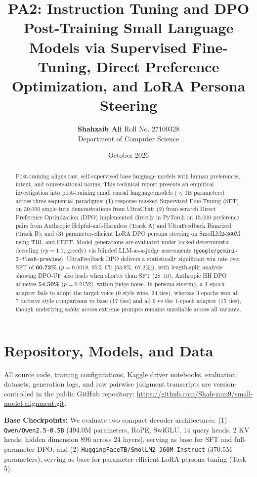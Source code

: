 \documentclass[11pt,a4paper]{article}
\title{\textbf{PA2: Instruction Tuning and DPO}\\
\large Post-Training Small Language Models via Supervised Fine-Tuning, Direct Preference Optimization, and LoRA Persona Steering}
\author{\textbf{Shahzaib Ali} \quad Roll No. 27100328\\
Department of Computer Science}
\date{October 2026}
\begin{document}
\maketitle

\begin{abstract}
Post-training aligns raw, self-supervised base language models with human preferences, intent, and conversational norms. This technical report presents an empirical investigation into post-training small causal language models ($<1\text{B}$ parameters) across three sequential paradigms: (1) response-masked Supervised Fine-Tuning (SFT) on 30,000 single-turn demonstrations from UltraChat; (2) from-scratch Direct Preference Optimization (DPO) implemented directly in PyTorch on 15,000 preference pairs from Anthropic Helpful-and-Harmless (Track A) and UltraFeedback Binarized (Track B); and (3) parameter-efficient LoRA DPO persona steering on SmolLM2-360M using TRL and PEFT. Model generations are evaluated under locked deterministic decoding ($rp=1.1$, greedy) via blinded LLM-as-a-judge assessments (\texttt{google/gemini-3-flash-preview}). UltraFeedback DPO delivers a statistically significant win rate over SFT of \textbf{60.73\%} ($p = 0.0018$, 95\% CI: [53.9\%, 67.2\%]), with length-split analysis showing DPO-UF also leads when shorter than SFT (28--10). Anthropic HH DPO achieves \textbf{54.50\%} ($p = 0.2152$), within judge noise. In persona steering, a 1-epoch adapter fails to adopt the target voice (0 style wins, 24 ties), whereas 3 epochs won all 7 decisive style comparisons vs base (17 ties) and all 9 vs the 1-epoch adapter (15 ties), though underlying safety across extreme prompts remains unreliable across all variants.
\end{abstract}

\section{Repository, Models, and Data}
\label{sec:models_data}

All source code, training configurations, Kaggle driver notebooks, evaluation datasets, generation logs, and raw pairwise judgment transcripts are version-controlled in the public GitHub repository: \url{https://github.com/Shah-zam9/small-model-alignment.git}.

\noindent\textbf{Base Checkpoints:} We evaluate two compact decoder architectures: (1) \texttt{Qwen/Qwen2.5-0.5B} (494.0M parameters, RoPE, SwiGLU, 14 query heads, 2 KV heads, hidden dimension 896 across 24 layers), serving as base for SFT and full-parameter DPO; and (2) \texttt{HuggingFaceTB/SmolLM2-360M-Instruct} (370.5M parameters), serving as base for parameter-efficient LoRA persona tuning (Task 5).
\end{document}
